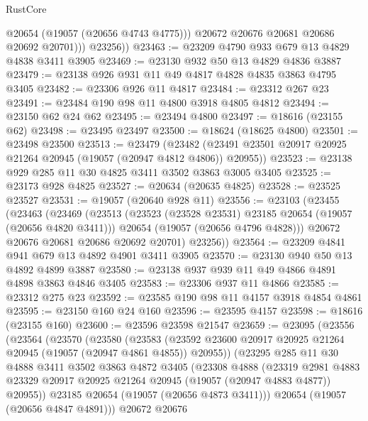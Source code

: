 \begin{lexlean}{RustCore}
\begin{coremodule}
                @20654
                (@19057 (@20656 @4743 @4775)))
              @20672
              @20676
              @20681
              @20686
              @20692
              @20701)))
        @23256))
@23463 := @23209 @4790 @933 @679 @13 @4829 @4838 @3411 @3905
@23469 := @23130 @932 @50 @13 @4829 @4836 @3887
@23479 := @23138 @926 @931 @11 @49 @4817 @4828 @4835 @3863 @4795 @3405
@23482 := @23306 @926 @11 @4817
@23484 := @23312 @267 @23
@23491 := @23484 @190 @98 @11 @4800 @3918 @4805 @4812
@23494 := @23150 @62 @24 @62
@23495 := @23494 @4800
@23497 := @18616 (@23155 @62)
@23498 := @23495 @23497
@23500 := @18624 (@18625 @4800)
@23501 := @23498 @23500
@23513 := @23479
    (@23482 (@23491 @23501 @20917 @20925 @21264 @20945 (@19057 (@20947 @4812 @4806)) @20955))
@23523 := @23138 @929 @285 @11 @30 @4825 @3411 @3502 @3863 @3005 @3405
@23525 := @23173 @928 @4825
@23527 := @20634 (@20635 @4825)
@23528 := @23525 @23527
@23531 := @19057 (@20640 @928 @11)
@23556 := @23103
    (@23455
      (@23463
        (@23469
          (@23513
            (@23523 (@23528 @23531) @23185 @20654 (@19057 (@20656 @4820 @3411)))
            @20654
            (@19057 (@20656 @4796 @4828)))
          @20672
          @20676
          @20681
          @20686
          @20692
          @20701)
        @23256))
@23564 := @23209 @4841 @941 @679 @13 @4892 @4901 @3411 @3905
@23570 := @23130 @940 @50 @13 @4892 @4899 @3887
@23580 := @23138 @937 @939 @11 @49 @4866 @4891 @4898 @3863 @4846 @3405
@23583 := @23306 @937 @11 @4866
@23585 := @23312 @275 @23
@23592 := @23585 @190 @98 @11 @4157 @3918 @4854 @4861
@23595 := @23150 @160 @24 @160
@23596 := @23595 @4157
@23598 := @18616 (@23155 @160)
@23600 := @23596 @23598 @21547
@23659 := @23095
    (@23556
      (@23564
        (@23570
          (@23580
            (@23583
              (@23592 @23600 @20917 @20925 @21264 @20945 (@19057 (@20947 @4861 @4855)) @20955))
            (@23295
              @285
              @11
              @30
              @4888
              @3411
              @3502
              @3863
              @4872
              @3405
              (@23308
                @4888
                (@23319
                  @2981
                  @4883
                  @23329
                  @20917
                  @20925
                  @21264
                  @20945
                  (@19057 (@20947 @4883 @4877))
                  @20955))
              @23185
              @20654
              (@19057 (@20656 @4873 @3411)))
            @20654
            (@19057 (@20656 @4847 @4891)))
          @20672
          @20676

\end{coremodule}
\end{lexlean}

